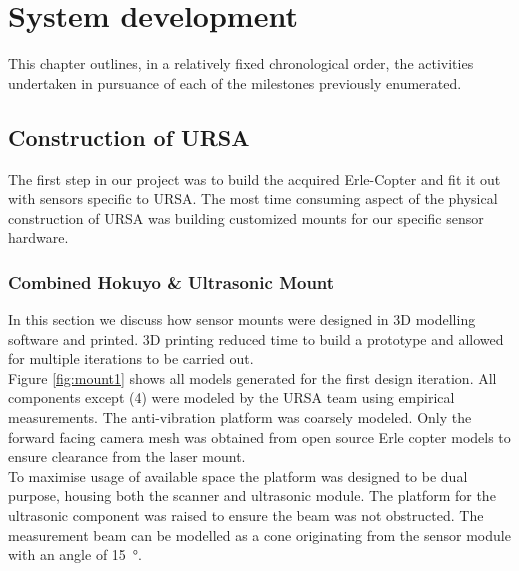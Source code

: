 \documentclass[capstone_report.tex]{subfiles}
\begin{document}
\chapter{System development}
This chapter outlines, in a relatively fixed chronological order, the activities undertaken in pursuance of each of the milestones previously enumerated. \\

\section{Construction of URSA}
The first step in our project was to build the acquired Erle-Copter and fit it out with sensors specific to URSA.  The most time consuming aspect of the physical construction of URSA was building customized mounts for our specific sensor hardware.\\

\subsection{Combined Hokuyo \& Ultrasonic Mount}
In this section we discuss how sensor mounts were designed in 3D modelling software and printed. 3D printing reduced time to build a prototype and allowed for multiple iterations to be carried out.\\

Figure \ref{fig:mount1} shows all models generated for the first design iteration.  All components except (4) were modeled by the URSA team using empirical measurements. The anti-vibration platform was coarsely modeled. Only the forward facing camera mesh was obtained from open source Erle copter models \cite{erle_camera_case} to ensure clearance from the laser mount.\\

To maximise usage of available space the platform was designed to be dual purpose, housing both the scanner and ultrasonic module.  The platform for the ultrasonic component was raised to ensure the beam was not obstructed.  The measurement beam can be modelled as a cone originating from the sensor module with an angle of \SI{15}{\degree}.
\end{document}

